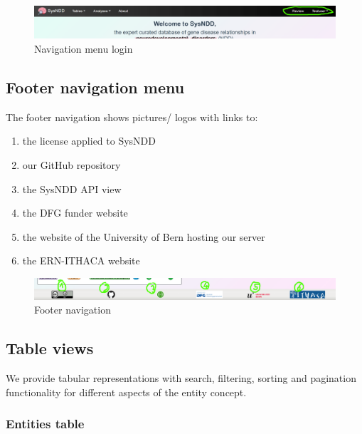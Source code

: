 \documentclass[
]{article}
\providecommand{\tightlist}{%
  \setlength{\itemsep}{0pt}\setlength{\parskip}{0pt}}
\begin{document}
\begin{figure}
\centering
\includegraphics{./static/img/02_05-navigation-menu-login.png}
\caption{Navigation menu login}
\end{figure}

\hypertarget{footer-navigation-menu}{%
\subsection{Footer navigation menu}\label{footer-navigation-menu}}

The footer navigation shows pictures/ logos with links to:

\begin{enumerate}
\def\labelenumi{\arabic{enumi})}
\tightlist
\item
  the license applied to SysNDD
\item
  our GitHub repository
\item
  the SysNDD API view
\item
  the DFG funder website
\item
  the website of the University of Bern hosting our server
\item
  the ERN-ITHACA website
\end{enumerate}

\begin{figure}
\centering
\includegraphics{./static/img/02_06-footer-menu.png}
\caption{Footer navigation}
\end{figure}

\hypertarget{table-views}{%
\subsection{Table views}\label{table-views}}

We provide tabular representations with search, filtering, sorting and pagination functionality for different aspects of the entity concept.

\hypertarget{entities-table}{%
\subsubsection{Entities table}\label{entities-table}}
\end{document}
